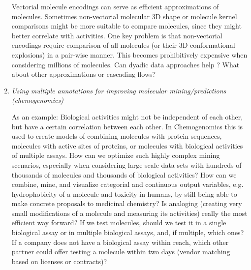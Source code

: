 \documentclass{sig-alternate}
\begin{document}
\begin{enumerate}
  Vectorial molecule encodings can serve as efficient approximations
  of molecules.  Sometimes non-vectorial molecular 3D shape or
  molecule kernel comparisons might be more suitable to compare
  molecules, since they might better correlate with activities. One
  key problem is that non-vectorial encodings require comparison of all
  molecules (or their 3D conformational explosions) in a pair-wise
  manner.  This becomes prohibitively expensive when considering
  millions of molecules.  Can dyadic data approaches help
  \cite{Hochreiter:2006:SVM:1159508.1159516}? What about other approximations or
  cascading flows?
%
\item \emph{Using multiple annotations for improving molecular mining/predictions (chemogenomics)}

  As an example: Biological activities might not be independent of
  each other, but have a certain correlation between each other.  In
  Chemogenomics this is used to create models of combining
  molecules with protein sequences, molecules with active sites of
  proteins, or molecules with biological activities of multiple
  assays. How can we optimize such highly complex mining scenarios,
  especially when considering large-scale data sets with hundreds of
  thousands of molecules and thousands of biological activities?  How can
  we combine, mine, and visualize categorial and continuous output
  variables, e.g. hydrophobicity of a molecule and toxicity in humans,
  by still being able to make concrete proposals to medicinal
  chemistry? Is analoging (creating very small modifications of a
  molecule and measuring its activities) really the most efficient way
  forward? If we test molecules, should we test it in a single
  biological assay or in multiple biological assays, and, if multiple,
  which ones?  If a company does not have a biological assay within
  reach, which other partner could offer testing a molecule within two
  days (vendor matching based on licenses or contracts)?
\end{enumerate}
\end{document}
